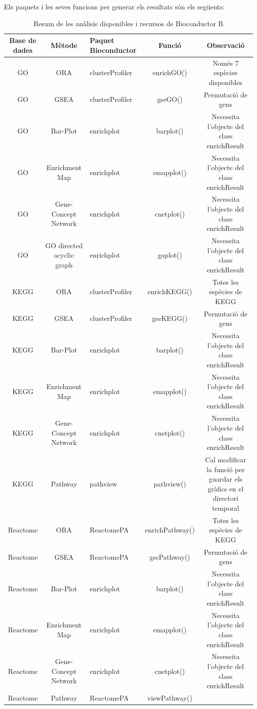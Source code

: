 Els paquets i les seves funcions per generar els resultats són els següents: 

\begin{table}[H]
\begin{adjustbox}{width=1\textwidth}
\small
\begin{tabular}{|| c | c | l | c | c ||} 
\hline
Base de dades & Mètode & Paquet Bioconductor & Funció & Observació \\ [0.5ex] 
\hline\hline
GO & ORA & clusterProfiler & enrichGO() & Només 7 espècies disponibles \\ 
\hline
GO & GSEA & clusterProfiler & gseGO() & Permutació de gens \\
\hline
GO & Bar-Plot & enrichplot & barplot() & Necessita l'objecte del class enrichResult \\
\hline
GO & Enrichment Map & enrichplot & emapplot() & Necessita l'objecte del class enrichResult \\
\hline
GO & Gene-Concept Network & enrichplot & cnetplot() & Necessita l'objecte del class enrichResult \\
\hline
GO & GO directed acyclic graph & enrichplot & goplot() & Necessita l'objecte del class enrichResult \\
\hline\hline
KEGG & ORA & clusterProfiler & enrichKEGG() & Totes les espècies de KEGG \\ 
\hline
KEGG & GSEA & clusterProfiler & gseKEGG() & Permutació de gens \\
\hline
KEGG & Bar-Plot & enrichplot & barplot() & Necessita l'objecte del class enrichResult \\
\hline
KEGG & Enrichment Map & enrichplot & emapplot() & Necessita l'objecte del class enrichResult \\
\hline
KEGG & Gene-Concept Network & enrichplot & cnetplot() & Necessita l'objecte del class enrichResult \\
\hline
KEGG & Pathway & pathview & pathview() & Cal modificar la funció per guardar els gràfics en el directori temporal \\
\hline\hline
Reactome & ORA & ReactomePA & enrichPathway() & Totes les espècies de KEGG \\ 
\hline
Reactome & GSEA & ReactomePA & gsePathway() & Permutació de gens \\
\hline
Reactome & Bar-Plot & enrichplot & barplot() & Necessita l'objecte del class enrichResult \\
\hline
Reactome & Enrichment Map & enrichplot & emapplot() & Necessita l'objecte del class enrichResult \\
\hline
Reactome & Gene-Concept Network & enrichplot & cnetplot() & Necessita l'objecte del class enrichResult \\
\hline
Reactome & Pathway & ReactomePA & viewPathway() &  \\
\hline
\hline
\end{tabular}
\end{adjustbox}
\caption{Resum de les anàlisis disponibles i recursos de Bioconductor R} 
\end{table}



